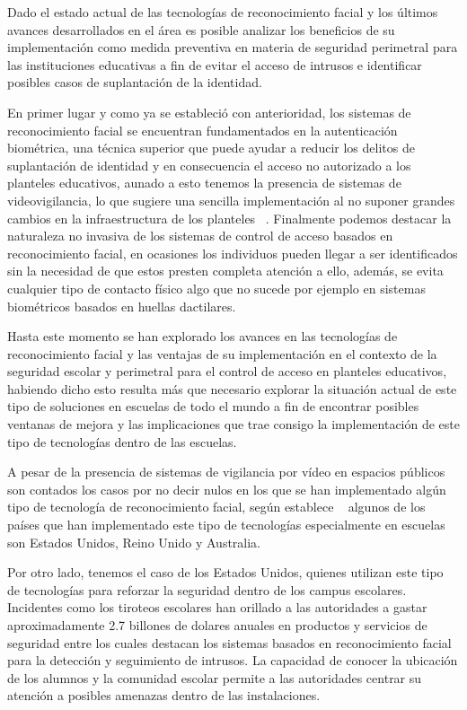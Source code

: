 Dado el estado actual de las tecnologías de reconocimiento facial y los últimos avances desarrollados en el área es posible analizar los beneficios de su implementación como medida preventiva en materia de seguridad perimetral para las instituciones educativas a fin de evitar el acceso de intrusos e identificar posibles casos de suplantación de la identidad.

En primer lugar y como ya se estableció con anterioridad, los sistemas de reconocimiento facial se encuentran fundamentados en la autenticación biométrica, una técnica superior que puede ayudar a reducir los delitos de suplantación de identidad y en consecuencia el acceso no autorizado a los planteles educativos, aunado a esto tenemos la presencia de sistemas de videovigilancia, lo que sugiere una sencilla implementación al no suponer grandes cambios en la infraestructura de los planteles ~\cite{FacialR}. Finalmente podemos destacar la naturaleza no invasiva de los sistemas de control de acceso basados en reconocimiento facial, en ocasiones los individuos pueden llegar a ser identificados sin la necesidad de que estos presten completa atención a ello, además, se evita cualquier tipo de contacto físico algo que no sucede por ejemplo en sistemas biométricos basados en huellas dactilares.


Hasta este momento se han explorado los avances en las tecnologías de reconocimiento facial y las ventajas de su implementación en el contexto de la seguridad escolar y perimetral para el control de acceso en planteles educativos, habiendo dicho esto resulta más que necesario explorar la situación actual de este tipo de soluciones en escuelas de todo el mundo a fin de encontrar posibles ventanas de mejora y las implicaciones que trae consigo la implementación de este tipo de tecnologías dentro de las escuelas.

A pesar de la presencia de sistemas de vigilancia por vídeo en espacios públicos son contados los casos por no decir nulos en los que se han implementado algún tipo de tecnología de reconocimiento facial, según establece ~\cite{FacialR} algunos de los países que han implementado este tipo de tecnologías especialmente en escuelas son Estados Unidos, Reino Unido y Australia.

Por otro lado, tenemos el caso de los Estados Unidos, quienes utilizan este tipo de tecnologías para reforzar la seguridad dentro de los campus escolares. Incidentes como los tiroteos escolares han orillado a las autoridades a gastar aproximadamente 2.7 billones de dolares anuales en productos y servicios de seguridad entre los cuales destacan los sistemas basados en reconocimiento facial para la detección y seguimiento de intrusos. La capacidad de conocer la ubicación de los alumnos y la comunidad escolar permite a las autoridades centrar su atención a posibles amenazas dentro de las instalaciones.

